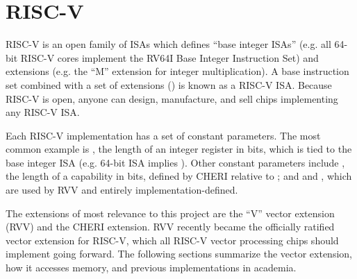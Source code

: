 \section{RISC-V}\label{chap:bg:sec:rvv}
RISC-V is an open family of ISAs which defines ``base integer ISAs'' (e.g. all 64-bit RISC-V cores implement the RV64I Base Integer Instruction Set) and extensions (e.g. the ``M'' extension for integer multiplication).
A base instruction set combined with a set of extensions () is known as a RISC-V ISA.
Because RISC-V is open, anyone can design, manufacture, and sell chips implementing any RISC-V ISA.

Each RISC-V implementation has a set of constant parameters.
The most common example is , the length of an integer register in bits, which is tied to the base integer ISA (e.g. 64-bit ISA implies ).
Other constant parameters include , the length of a capability in bits, defined by CHERI relative to ; and  and , which are used by RVV and entirely implementation-defined.

The extensions of most relevance to this project are the ``V'' vector extension (RVV) and the CHERI extension.
RVV recently became the officially ratified vector extension for RISC-V, which all RISC-V vector processing chips should implement going forward.
The following sections summarize the vector extension, how it accesses memory, and previous implementations in academia.

